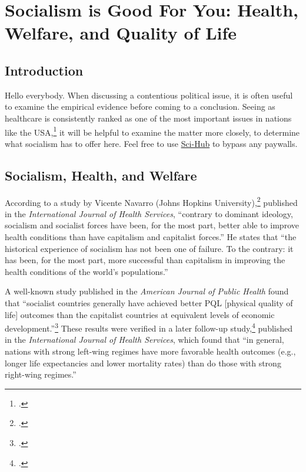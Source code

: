 \section[Socialism is Good For You]{Socialism is Good For You: Health, Welfare, and Quality of Life\\}
\subsection*{Introduction}

Hello everybody.
When discussing a contentious political issue, it is often useful to examine the empirical evidence before coming to a conclusion.
Seeing as healthcare is consistently ranked as one of the most important issues in nations like the USA,\footcite{hyrn-issues} it will be helpful to examine the matter more closely, to determine what socialism has to offer here.
Feel free to use \href{https://scihub.bban.top/}{Sci-Hub} to bypass any paywalls.

\subsection*{Socialism, Health, and Welfare}

According to a study by Vicente Navarro (Johns Hopkins University),\footcite{navarro-socialism} published in the \textit{International Journal of Health Services}, ``contrary to dominant ideology, socialism and socialist forces have been, for the most part, better able to improve health conditions than have capitalism and capitalist forces.''
He states that ``the historical experience of socialism has not been one of failure.
To the contrary: it has been, for the most part, more successful than capitalism in improving the health conditions of the world's populations.''

A well-known study published in the \textit{American Journal of Public Health} found that ``socialist countries generally have achieved better PQL [physical quality of life] outcomes than the capitalist countries at equivalent levels of economic development.''\footcite{cereseto-economic}
These results were verified in a later follow-up study,\footcite{lena-political} published in the \textit{International Journal of Health Services}, which found that ``in general, nations with strong left-wing regimes have more favorable health outcomes (e.g., longer life expectancies and lower mortality rates) than do those with strong right-wing regimes.''

